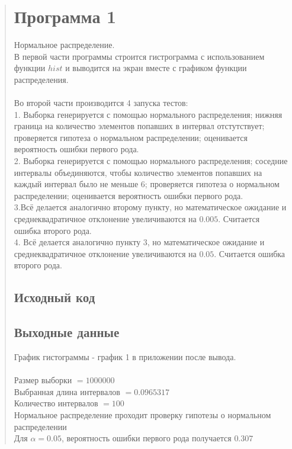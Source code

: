 \documentclass{article}
\begin{document}
\begin{quote}
\section{Программа 1}	
        Нормальное распределение. \\
	В первой части программы строится гистрограмма с использованием функции $hist$ и выводится на экран вместе с графиком функции распределения. \\ \\
	Во второй части производится 4 запуска тестов: \\
	1. Выборка генерируется с помощью нормального распределения; нижняя граница на количество элементов попавших в интервал отстутствует; проверяется гипотеза о нормальном распределении; оценивается вероятность ошибки первого рода. \\
	2. Выборка генерируется с помощью нормального распределения; соседние интервалы объединяются, чтобы количество элементов попавших на каждый интервал было не меньше 6; проверяется гипотеза о нормальном распределении; оценивается вероятность ошибки первого рода. \\
	3.Всё делается аналогично второму пункту, но математическое ожидание и среднеквадратичное отклонение увеличиваются на $0.005$. Считается ошибка второго рода. \\
	4. Всё делается аналогично пункту 3, но математическое ожидание и среднеквадратичное отклонение увеличиваются на $0.05$. Считается ошибка второго рода.
\subsection{Исходный код}
	
\subsection{Выходные данные}
	График гистограммы - график 1 в приложении после вывода. \\ \\

	Размер выборки $= 1000000$ \\
	Выбранная длина интервалов $= 0.0965317$ \\
	Количество интервалов $= 100$ \\

	Нормальное распределение проходит проверку гипотезы о нормальном распределении \\
	Для $\alpha = 0.05$, вероятность ошибки первого рода получается $0.307$ \\


\end{quote}
\end{document}
